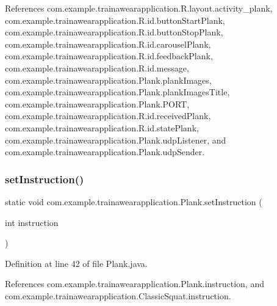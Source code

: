 References com.\+example.\+trainawearapplication.\+R.\+layout.\+activity\+\_\+plank, com.\+example.\+trainawearapplication.\+R.\+id.\+button\+Start\+Plank, com.\+example.\+trainawearapplication.\+R.\+id.\+button\+Stop\+Plank, com.\+example.\+trainawearapplication.\+R.\+id.\+carousel\+Plank, com.\+example.\+trainawearapplication.\+R.\+id.\+feedback\+Plank, com.\+example.\+trainawearapplication.\+R.\+id.\+message, com.\+example.\+trainawearapplication.\+Plank.\+plank\+Images, com.\+example.\+trainawearapplication.\+Plank.\+plank\+Images\+Title, com.\+example.\+trainawearapplication.\+Plank.\+P\+O\+RT, com.\+example.\+trainawearapplication.\+R.\+id.\+received\+Plank, com.\+example.\+trainawearapplication.\+R.\+id.\+state\+Plank, com.\+example.\+trainawearapplication.\+Plank.\+udp\+Listener, and com.\+example.\+trainawearapplication.\+Plank.\+udp\+Sender.

\mbox{\label{classcom_1_1example_1_1trainawearapplication_1_1_plank_a3cc3d10c2310227ff9fe69e49afac328}} 
\subsubsection{\texorpdfstring{setInstruction()}{setInstruction()}}
{\footnotesize\ttfamily static void com.\+example.\+trainawearapplication.\+Plank.\+set\+Instruction (\begin{DoxyParamCaption}\item[{int}]{instruction }\end{DoxyParamCaption})\hspace{0.3cm}{\ttfamily [static]}}



Definition at line 42 of file Plank.\+java.


\begin{DoxyCode}{0}

\end{DoxyCode}


References com.\+example.\+trainawearapplication.\+Plank.\+instruction, and com.\+example.\+trainawearapplication.\+Classic\+Squat.\+instruction.

